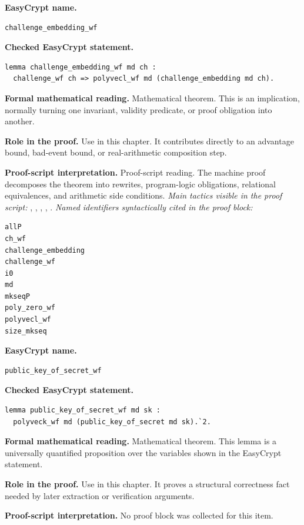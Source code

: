 \begin{formaltheorem}
\noindent\textbf{EasyCrypt name.}
\begin{lstlisting}[language=EasyCrypt,basicstyle=\ttfamily\scriptsize]
challenge_embedding_wf
\end{lstlisting}
\noindent\textbf{Checked EasyCrypt statement.}
\begin{lstlisting}[language=EasyCrypt,basicstyle=\ttfamily\scriptsize]
lemma challenge_embedding_wf md ch :
  challenge_wf ch => polyvecl_wf md (challenge_embedding md ch).
\end{lstlisting}
\noindent\textbf{Formal mathematical reading.}
Mathematical theorem. This is an implication, normally turning one invariant, validity predicate, or proof obligation into another.

\noindent\textbf{Role in the proof.}
Use in this chapter. It contributes directly to an advantage bound, bad-event bound, or real-arithmetic composition step.

\noindent\textbf{Proof-script interpretation.}
Proof-script reading. The machine proof decomposes the theorem into rewrites, program-logic obligations, relational equivalences, and arithmetic side conditions.
\emph{Main tactics visible in the proof script:} , , , , .
\emph{Named identifiers syntactically cited in the proof block:}
\begin{lstlisting}[language=EasyCrypt,basicstyle=\ttfamily\scriptsize]
allP
ch_wf
challenge_embedding
challenge_wf
i0
md
mkseqP
poly_zero_wf
polyvecl_wf
size_mkseq
\end{lstlisting}

\end{formaltheorem}

\begin{formaltheorem}
\noindent\textbf{EasyCrypt name.}
\begin{lstlisting}[language=EasyCrypt,basicstyle=\ttfamily\scriptsize]
public_key_of_secret_wf
\end{lstlisting}
\noindent\textbf{Checked EasyCrypt statement.}
\begin{lstlisting}[language=EasyCrypt,basicstyle=\ttfamily\scriptsize]
lemma public_key_of_secret_wf md sk :
  polyveck_wf md (public_key_of_secret md sk).`2.
\end{lstlisting}
\noindent\textbf{Formal mathematical reading.}
Mathematical theorem. This lemma is a universally quantified proposition over the variables shown in the EasyCrypt statement.

\noindent\textbf{Role in the proof.}
Use in this chapter. It proves a structural correctness fact needed by later extraction or verification arguments.

\noindent\textbf{Proof-script interpretation.}
No proof block was collected for this item.

\end{formaltheorem}

